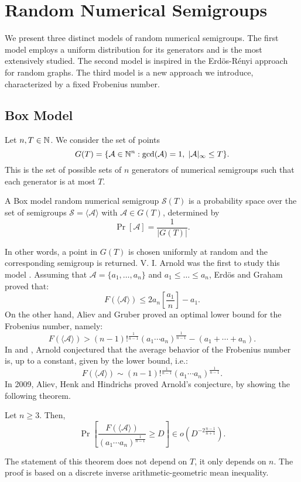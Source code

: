 
\chapter{Random Numerical Semigroups}\label{chap:randnumsems}

We present three distinct models of random numerical semigroups. The first model employs a uniform distribution for its generators and is the most extensively studied. The second model is inspired in the Erdös-Rényi approach for random graphs. The third model is a new approach we introduce, characterized by a fixed Frobenius number.

\section{Box Model}\label{sec:randomsmpgs:intro}

Let $n, T \in \mathbb{N}$. We consider the set of points
\[G(T) = \{\mathcal{A} \in \mathbb{N}^n : \mathrm{gcd}(\mathcal{A}) = 1, \; |\mathcal{A}|_\infty \leq T\}.\]
This is the set of possible sets of $n$ generators of numerical semigroups such that each generator is at most $T$. 
\begin{definition}
    A Box model random numerical semigroup $\mathcal{S}(T)$ is a probability space over the set of semigroups $\mathcal{S} = \langle\mathcal{A}\rangle$ with $\mathcal{A} \in G(T)$, determined by
    \[\Pr[ \mathcal{A}] = \frac{1}{|G(T)|}.\]
\end{definition}
In other words, a point in $G(T)$ is chosen uniformly at random and the corresponding semigroup is returned. V. I. Arnold was the first to study this model \cite{arnold1999weak}.  Assuming that $\mathcal{A} = \{a_1, \ldots, a_n\}$ and $a_1 \leq \ldots \leq a_n$, Erdös and Graham \cite{erdos1972linear} proved that: 
\[F(\langle\mathcal{A} \rangle)  \leq 2 a_n\left[\frac{a_1}{n}\right]  - a_1.\]
On the other hand, Aliev and Gruber \cite{aliev2007optimal} proved an optimal lower bound for the Frobenius number, namely:
\[F(\langle\mathcal{A} \rangle)  > (n - 1)!^{\frac{1}{n - 1}}(a_1\cdots a_n)^{\frac{1}{n - 1}} - (a_1 + \cdots + a_n).\]
In \cite{arnold1999weak} and \cite{arnold2004arnold}, Arnold conjectured that the average behavior of the Frobenius number is, up to a constant, given by the lower bound, i.e.:
\[F(\langle\mathcal{A}\rangle) \sim (n - 1)!^{\frac{1}{n - 1}}(a_1\cdots a_n)^{\frac{1}{n - 1}}.\]
In 2009, Aliev, Henk and Hindrichs \cite{aliev2011expected} proved Arnold's conjecture, by showing the following theorem. 
\begin{theorem} Let $n \geq 3$. Then, 
    \[\Pr\left[\frac{F(\langle\mathcal{A}\rangle)}{(a_1\cdots a_n)^{\frac{1}{n - 1}}}\geq D\right]  \in o(D^{-2\frac{n - 1}{n + 1}}).\]
\end{theorem}
The statement of this theorem does not depend on $T$, it only depends on $n$. The proof is based on a discrete inverse arithmetic-geometric mean inequality.

